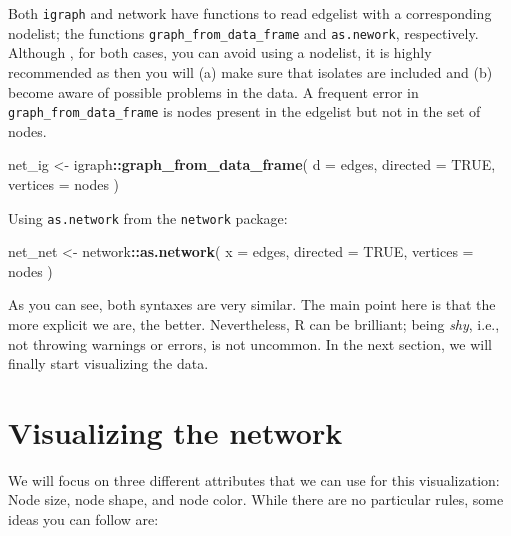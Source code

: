 \documentclass[]{book}
\newenvironment{Shaded}{\begin{snugshade}}{\end{snugshade}}
\newcommand{\DataTypeTok}[1]{\textcolor[rgb]{0.13,0.29,0.53}{#1}}
\newcommand{\KeywordTok}[1]{\textcolor[rgb]{0.13,0.29,0.53}{\textbf{#1}}}
\newcommand{\NormalTok}[1]{#1}
\newcommand{\OperatorTok}[1]{\textcolor[rgb]{0.81,0.36,0.00}{\textbf{#1}}}
\newcommand{\OtherTok}[1]{\textcolor[rgb]{0.56,0.35,0.01}{#1}}
\newcommand{\StringTok}[1]{\textcolor[rgb]{0.31,0.60,0.02}{#1}}
\begin{document}
Both \texttt{igraph} and network have functions to read edgelist with a corresponding
nodelist; the functions \texttt{graph\_from\_data\_frame} and \texttt{as.nework}, respectively. Although
, for both cases, you can avoid using a nodelist, it is highly recommended as then
you will (a) make sure that isolates are included and (b) become aware of possible
problems in the data. A frequent error in \texttt{graph\_from\_data\_frame} is nodes present
in the edgelist but not in the set of nodes.

\begin{Shaded}
\begin{Highlighting}[]
\NormalTok{net_ig <-}\StringTok{ }\NormalTok{igraph}\OperatorTok{::}\KeywordTok{graph_from_data_frame}\NormalTok{(}
  \DataTypeTok{d        =}\NormalTok{ edges,}
  \DataTypeTok{directed =} \OtherTok{TRUE}\NormalTok{,}
  \DataTypeTok{vertices =}\NormalTok{ nodes}
\NormalTok{)}
\end{Highlighting}
\end{Shaded}

Using \texttt{as.network} from the \texttt{network} package:

\begin{Shaded}
\begin{Highlighting}[]
\NormalTok{net_net <-}\StringTok{ }\NormalTok{network}\OperatorTok{::}\KeywordTok{as.network}\NormalTok{(}
  \DataTypeTok{x        =}\NormalTok{ edges,}
  \DataTypeTok{directed =} \OtherTok{TRUE}\NormalTok{,}
  \DataTypeTok{vertices =}\NormalTok{ nodes}
\NormalTok{)}
\end{Highlighting}
\end{Shaded}

As you can see, both syntaxes are very similar. The main point here is that the
more explicit we are, the better. Nevertheless, R can be brilliant; being
\emph{shy}, i.e., not throwing warnings or errors, is not uncommon. In the next
section, we will finally start visualizing the data.

\hypertarget{visualizing-the-network}{%
\section{Visualizing the network}\label{visualizing-the-network}}

We will focus on three different attributes that we can use for this visualization:
Node size, node shape, and node color. While there are no particular rules, some
ideas you can follow are:
\end{document}
